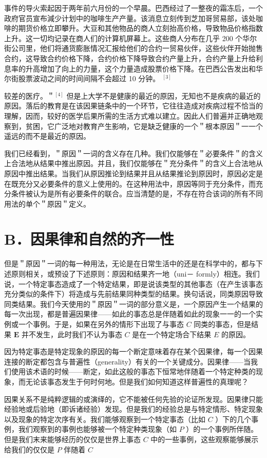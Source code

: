 事件的导火索起因于两年前六月份的一个早晨。巴西经过了一整夜的霜冻后，一个政府官员宣布減少计划中的咖啡生产产量。该消息立刻传到芝加哥贸易部，该处咖啡的期货价格立即攀升。大豆和其他物品的商人立刻抬高价格，导致物品价格指数上升。这一切均记录在商人们的计算机屏幕上。这些商人分布在几乎 200 个华尔街公司里，他们将通货膨胀情况汇报给他们的合约一贸易伙伴，这些伙伴开始抛售合约，这导致合约价格下降，合约价格下降导致合约产量上升，合约产量上升给利息率的升高增加了向上的力量，这个力量造成股票价格下降。在巴西公告发出和华尔街股票波动之间的时间间隔不会超过 10 分钟。 ${ }^{[3]}$

较差的医疗。＂${ }^{[4]}$ 但是上大学不是健康的最近的原因，无知也不是疾病的最近的原因。落后的教育是在该因果链条中的一个环节，它往往造成对疾病过程不恰当的理解，因而，较好的医学后果所需的生活方式难以建立。因此人们普遍并正确地观察到，贫困，它广泛地对教育产生影响，它是缺乏健康的一个＂根本原因＂一一个遥远的而不是最近的原因。

我们已经看到，＂原因＂一词的含义存在几种。我们仅能够在＂必要条件＂的含义上合法地从结果中推出原因。并且，我们仅能够在＂充分条件＂的含义上合法地从原因中推出结果。当我们从原因推论到结果并且从结果推论到原因时，原因必定是在既充分又必要条件的意义上使用的。在这种用法中，原因等同于充分条件，而充分条件被认为是所有必要条件的联合。应当清楚的是，不存在符合该词的所有不同用法的单个＂原因＂定义。

\section*{B．因果律和自然的齐一性}
但是＂原因＂一词的每一种用法，无论是在日常生活中的还是在科学中的，都与下述原则相关，或预设了下述原则：原因和结果齐一地（uni－ formly）相连。我们说，一个特定事态造成了一个特定结果，即是说该类型的其他事态（在产生该事态充分类似的条件下）将造成与先前结果同种类型的结果。换句话说，同类原因导致同类结果。我们今天使用的＂原因＂一词的部分意义是，一个原因产生一个结果的每一次出现，都是普遍因果律——如此的事态总是伴随着如此的现象一一的一个实例或一个事例。于是，如果在另外的情形下出现了与事态 $C$ 同类的事态，但是结果 $\boldsymbol{E}$ 并不发生，此时我们不认为事态 $C$ 是在一个特定场合下结果 $E$ 的原因。

因为特定事态是特定现象的原因的每一个断定意味着存在某个因果律，每一个因果连接的断定都包含与普遍性（generality）有关的一个关键成分。因果律——当我们使用该术语的时候——断定，如此这般的事态下恒常地伴随着一个特定种类的现象，而无论该事态发生于何时何地。但是我们如何知道这样普遍性的真理呢？

因果关系不是纯粹逻辑的或演绎的，它不能被任何先验的论证所发现。因果律只能经验地或后验地（即诉诸经验）发现。但是我们的经验总是与特定情形、特定现象以及现象的特定次序有关。我们能够观察到一个特定事态（比如 $C$ ）下的几个事例，我们观察到的事例也能够被一个特定种类现象（如 $P$ ）的一个事例所伴随。但是我们末来能够经历的仅仅是世界上事态 $C$ 中的一些事例，这些观察能够展示给我们的仅仅是 $P$ 伴随着 $C$

